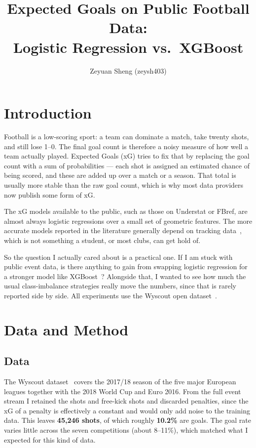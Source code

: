 \documentclass[journal]{vgtc}                %
\title{Expected Goals on Public Football Data:\\
Logistic Regression vs.\ XGBoost}
\author{Zeyuan Sheng (zeysh403)}
\begin{document}
\maketitle

\section{Introduction}

Football is a low-scoring sport: a team can dominate a match, take twenty
shots, and still lose 1--0. The final goal count is therefore a noisy
measure of how well a team actually played. Expected Goals (xG) tries to
fix that by replacing the goal count with a sum of probabilities --- each
shot is assigned an estimated chance of being scored, and these are added
up over a match or a season. That total is usually more stable than the
raw goal count, which is why most data providers now publish some form of
xG.

The xG models available to the public, such as those on Understat or
FBref, are almost always logistic regressions over a small set of
geometric features. The more accurate models reported in the literature
generally depend on tracking data~\cite{xgSerieA2024}, which is not
something a student, or most clubs, can get hold of.

So the question I actually cared about is a practical one. If I am stuck
with public event data, is there anything to gain from swapping logistic
regression for a stronger model like XGBoost~\cite{chen2016xgboost}?
Alongside that, I wanted to see how much the usual class-imbalance
strategies really move the numbers, since that is rarely reported
side by side. All experiments use the Wyscout open
dataset~\cite{pappalardo2019wyscout}.

\section{Data and Method}

\subsection{Data}
The Wyscout dataset~\cite{pappalardo2019wyscout} covers the 2017/18
season of the five major European leagues together with the 2018 World
Cup and Euro 2016. From the full event stream I retained the shots and
free-kick shots and discarded penalties, since the xG of a penalty is
effectively a constant and would only add noise to the training data.
This leaves \textbf{45{,}246 shots}, of which roughly \textbf{10.2\%} are
goals. The goal rate varies little across the seven competitions (about
8--11\%), which matched what I expected for this kind of data.
\end{document}
